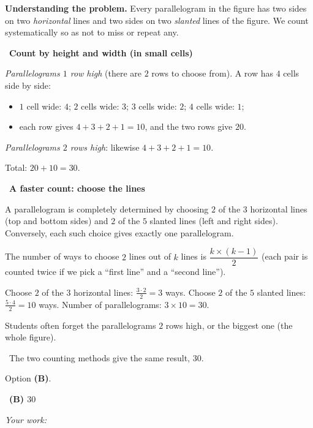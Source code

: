 \documentclass[11pt]{article}
\newif\ifsol \solfalse
\providecommand{\AnsWord}{Đáp số}
\newcommand{\ans}[1]{\par\smallskip{\bfseries\color{tmGreen!88!black}\AnsWord:}\ {\bfseries\color{AnsRed}#1}\par}
\newcommand{\probsol}[1]{%
  \begin{lrbox}{\solmeasure}\begin{minipage}{\dimexpr\linewidth-24pt\relax}#1\end{minipage}\end{lrbox}%
  \ifsol
    \begin{solbox}#1\end{solbox}%
  \else
    \setlength{\solht}{\dimexpr\ht\solmeasure+\dp\solmeasure+0.85cm\relax}%
    \ifdim\solht<1.35cm\setlength{\solht}{1.35cm}\fi
    \ifdim\solht>\StudentMaxWork\setlength{\solht}{\StudentMaxWork}\fi
    \begin{tcolorbox}[colback=white,colframe=Line,boxrule=0.8pt,arc=5pt,
      left=8pt,right=8pt,top=4pt,bottom=4pt,height=\solht]{\footnotesize\color{Slate}\itshape\WorkWord}\end{tcolorbox}%
  \fi}
\newlength{\StudentMaxWork}\setlength{\StudentMaxWork}{7.5cm}
\newcommand{\step}[2]{\par\smallskip\noindent{\bfseries\color{tmBlue!85!black}\StepWord~#1.}\ {\bfseries #2}\par\nopagebreak}
\newcommand{\verify}[1]{\par\smallskip\noindent{\bfseries\color{tmGreen!80!black}\faCheckCircle\ \CheckWord}\ #1\par}
\def\WorkWord{Your work:}
\def\AnsWord{Answer}
\def\StepWord{Step}
\def\CheckWord{Check:}
\begin{document}
\probsol{
\textbf{Understanding the problem.} Every parallelogram in the figure has two sides on two \emph{horizontal}
lines and two sides on two \emph{slanted} lines of the figure. We count systematically so as not to miss or
repeat any.

\step{1}{Count by height and width (in small cells)}
\emph{Parallelograms $1$ row high} (there are $2$ rows to choose from). A row has $4$ cells side by side:
\begin{itemize}[leftmargin=1.4em,itemsep=1pt]
\item $1$ cell wide: $4$; $2$ cells wide: $3$; $3$ cells wide: $2$; $4$ cells wide: $1$;
\item each row gives $4+3+2+1=10$, and the two rows give $20$.
\end{itemize}
\emph{Parallelograms $2$ rows high}: likewise $4+3+2+1=10$.

Total: $20+10=30$.

\step{2}{A faster count: choose the lines}
\begin{proofbox}A parallelogram is completely determined by choosing $2$ of the $3$ horizontal lines (top and
bottom sides) and $2$ of the $5$ slanted lines (left and right sides). Conversely, each such choice gives exactly
one parallelogram.\end{proofbox}
\begin{recallbox}The number of ways to choose $2$ lines out of $k$ lines is $\dfrac{k\times(k-1)}{2}$ (each pair
is counted twice if we pick a ``first line'' and a ``second line'').\end{recallbox}
Choose $2$ of the $3$ horizontal lines: $\tfrac{3\cdot 2}{2}=3$ ways. Choose $2$ of the $5$ slanted lines:
$\tfrac{5\cdot4}{2}=10$ ways. Number of parallelograms: $3\times 10=30$.

\begin{warnbox}Students often forget the parallelograms $2$ rows high, or the biggest one (the whole
figure).\end{warnbox}
\verify{The two counting methods give the same result, $30$.}
Option \textbf{(B)}.
\ans{(B) $30$}
}
\end{document}
